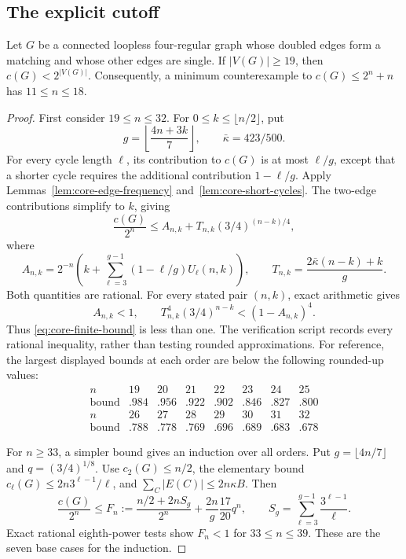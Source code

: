 \subsection{The explicit cutoff}

\begin{theorem}\label{thm:four-core-cutoff}
Let $G$ be a connected loopless four-regular graph whose doubled edges form a matching and whose other edges are single.
If $|V(G)|\ge19$, then $c(G)<2^{|V(G)|}$.
Consequently, a minimum counterexample to $c(G)\le2^n+n$ has $11\le n\le18$.
\end{theorem}

\begin{proof}
First consider $19\le n\le32$.
For $0\le k\le\lfloor n/2\rfloor$, put
\[
 g=\left\lfloor\frac{4n+3k}{7}\right\rfloor,
 \qquad \bar\kappa=423/500.
\]
For every cycle length $\ell$, its contribution to $c(G)$ is at most $\ell/g$,
except that a shorter cycle requires the additional contribution $1-\ell/g$.
Apply Lemmas~\ref{lem:core-edge-frequency} and~\ref{lem:core-short-cycles}.
The two-edge contributions simplify to $k$, giving
\begin{equation}\label{eq:core-finite-bound}
 \frac{c(G)}{2^n}\le A_{n,k}+T_{n,k}(3/4)^{(n-k)/4},
\end{equation}
where
\[
 A_{n,k}=2^{-n}\left(k+
   \sum_{\ell=3}^{g-1}(1-\ell/g)U_\ell(n,k)\right),
 \qquad T_{n,k}=\frac{2\bar\kappa(n-k)+k}{g}.
\]
Both quantities are rational.
For every stated pair $(n,k)$, exact arithmetic gives
\begin{equation}\label{eq:core-rational-certificate}
 A_{n,k}<1,\qquad
 T_{n,k}^4(3/4)^{n-k}<(1-A_{n,k})^4.
\end{equation}
Thus \eqref{eq:core-finite-bound} is less than one.
The verification script records every rational inequality, rather than testing rounded approximations.
For reference, the largest displayed bounds at each order are below the following rounded-up values:
\[
\begin{array}{c|rrrrrrr}
n&19&20&21&22&23&24&25\\\hline
\text{bound}&.984&.956&.922&.902&.846&.827&.800\\
n&26&27&28&29&30&31&32\\\hline
\text{bound}&.788&.778&.769&.696&.689&.683&.678
\end{array}
\]

For $n\ge33$, a simpler bound gives an induction over all orders.
Put $g=\lfloor4n/7\rfloor$ and $q=(3/4)^{1/8}$.
Use $c_2(G)\le n/2$, the elementary bound $c_\ell(G)\le2n3^{\ell-1}/\ell$,
and $\sum_C|E(C)|\le2n\kappa B$.
Then
\begin{equation}\label{eq:core-tail-bound}
 \frac{c(G)}{2^n}
 \le F_n:=\frac{n/2+2nS_g}{2^n}+
              \frac{2n}{g}\frac{17}{20}q^n,
 \qquad S_g=\sum_{\ell=3}^{g-1}\frac{3^{\ell-1}}\ell.
\end{equation}
Exact rational eighth-power tests show $F_n<1$ for $33\le n\le39$.
These are the seven base cases for the induction.


\end{proof}
